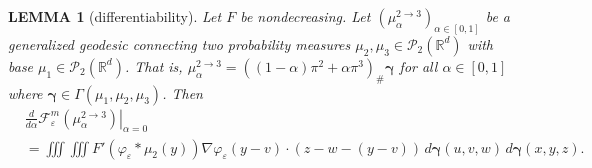 \documentclass[11pt,leqno]{amsart}
\newtheorem{lem}[thm]{LEMMA}
\theoremstyle{definition}
\newcommand{\R}{{\mathord{\mathbb R}}}
\newcommand{\grad}{\nabla}
\newcommand{\F}{\mathcal{F}}
\def\P{{\mathcal P}}
\def\e{\varepsilon}
\newcommand{\bgamma}{\boldsymbol{\gamma}}
\def\F{\mathcal{F}}
\begin{document}
\begin{lem}[differentiability] \label{diff lem}
	Let $F$ be nondecreasing. Let $(\mu_\alpha^{2\to3})_{\alpha\in[0,1]}$ be a generalized geodesic connecting two probability measures $\mu_2,\mu_3\in\P_2(\R^d)$ with base $\mu_1\in\P_2(\R^d)$. That is, $\mu_\alpha^{2\to3} = \left((1-\alpha)\pi^2+\alpha\pi^3\right)_\# \bgamma$ for all $\alpha \in[0,1]$ where $\bgamma\in\Gamma(\mu_1,\mu_2,\mu_3)$. Then
\begin{equation} \label{diff lem eqn} 
	\begin{split}
		&\left. \frac{d}{d \alpha } \F^m_\e(\mu_\alpha^{2\to3}) \right|_{\alpha = 0}\\
		&=\iiint \iiint F'\left(\varphi_\e*\mu_2(y) \right) \grad \varphi_\e(y-v) \cdot (z-w-(y-v)) \,d \bgamma(u,v,w)\, d \bgamma(x,y,z). 
	\end{split}
\end{equation}
\end{lem}
\end{document}
